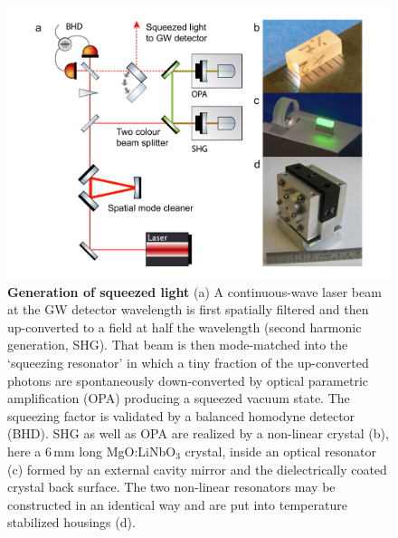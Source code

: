 \begin{figure}[ht]
  \centering
  \includegraphics[scale = .41]{./Sec_Optics/SqzGen.pdf}
  \vspace{-1mm}
\caption{{\textbf{Generation of squeezed light} (a) A continuous-wave laser beam at the GW detector wavelength is first spatially filtered and then up-converted to a field at half the wavelength (second harmonic generation, SHG). That beam is then mode-matched into the `squeezing resonator' in which a tiny fraction of the up-converted photons are spontaneously down-converted by optical parametric amplification (OPA) producing a squeezed vacuum state. The squeezing factor is validated by a balanced homodyne detector (BHD). SHG as well as OPA are realized by a non-linear crystal (b), here a 6\,mm long MgO:LiNbO$_3$ crystal, inside an optical resonator (c) formed by an external cavity mirror and the dielectrically coated crystal back surface. The two non-linear resonators may be constructed in an identical way and are put into temperature stabilized housings (d).}
}
\label{fig:SqzGen}
\end{figure}

